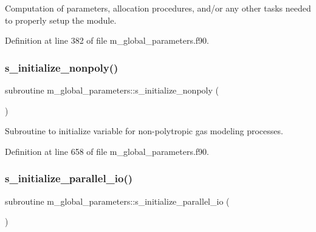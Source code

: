 Computation of parameters, allocation procedures, and/or any other tasks needed to properly setup the module. 



Definition at line 382 of file m\+\_\+global\+\_\+parameters.\+f90.

\mbox{\label{namespacem__global__parameters_a1611e2cf82243c04b04a11281ef67993}} 
\subsubsection{\texorpdfstring{s\+\_\+initialize\+\_\+nonpoly()}{s\_initialize\_nonpoly()}}
{\footnotesize\ttfamily subroutine m\+\_\+global\+\_\+parameters\+::s\+\_\+initialize\+\_\+nonpoly (\begin{DoxyParamCaption}{ }\end{DoxyParamCaption})}



Subroutine to initialize variable for non-\/polytropic gas modeling processes. 



Definition at line 658 of file m\+\_\+global\+\_\+parameters.\+f90.

\mbox{\label{namespacem__global__parameters_a54905a7a2ce9e15fc33ebac52c0d3c27}} 
\subsubsection{\texorpdfstring{s\+\_\+initialize\+\_\+parallel\+\_\+io()}{s\_initialize\_parallel\_io()}}
{\footnotesize\ttfamily subroutine m\+\_\+global\+\_\+parameters\+::s\+\_\+initialize\+\_\+parallel\+\_\+io (\begin{DoxyParamCaption}{ }\end{DoxyParamCaption})}



